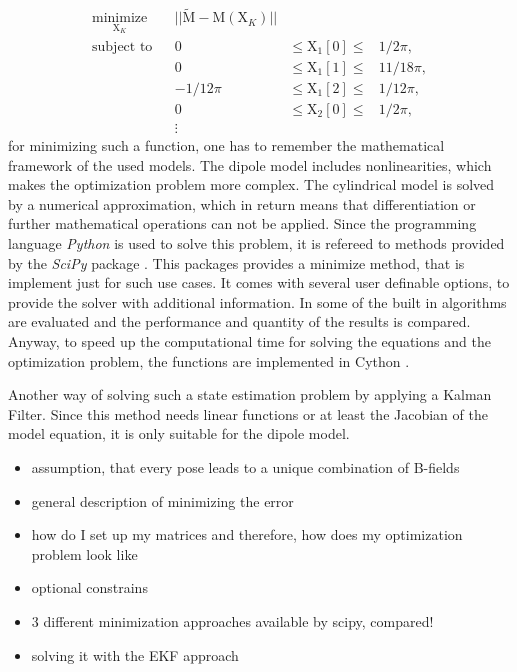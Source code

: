 \begin{equation}
\begin{aligned}
\underset{\mathrm{X}_K}{\text{minimize}} & & || \tilde{\mathrm{M}} - \mathrm{M}(\mathrm{X}_K) ||\\
\text{subject to} & & 0 & \leq \mathrm{X}_1[0] \leq & 1/2 \pi, \\ 
				  & & 0 & \leq \mathrm{X}_1[1]  \leq & 11/18 \pi, \\
				  & & -1/12 \pi & \leq \mathrm{X}_1[2] \leq & 1/12 \pi, \\
				  & & 0 & \leq \mathrm{X}_2[0]  \leq & 1/2 \pi, \\
				  & & \vdots
\end{aligned}
\end{equation}
for minimizing such a function, one has to remember the mathematical framework of the used models. The dipole model includes nonlinearities, which makes the optimization problem more complex. The cylindrical model is solved by a numerical approximation, which in return means that differentiation or further mathematical operations can not be applied. Since the programming language \emph{Python} is used to solve this problem, it is refereed to methods provided by the \emph{SciPy} package . This packages provides a minimize method, that is implement just for such use cases. It comes with several user definable options, to provide the solver with additional information. In  some of the built in algorithms are evaluated and the performance and quantity of the results is compared. Anyway, to speed up the computational time for solving the equations and the optimization problem, the functions are implemented in Cython .

Another way of solving such a state estimation problem by applying a Kalman Filter. Since this method needs linear functions or at least the Jacobian of the model equation, it is only suitable for the dipole model.






\begin{itemize}
\item assumption, that every pose leads to a unique combination of B-fields
\item general description of minimizing the error
\item how do I set up my matrices and therefore, how does my optimization problem look like
\item optional constrains
\item 3 different minimization approaches available by scipy, compared!
\item solving it with the EKF approach
\end{itemize}


